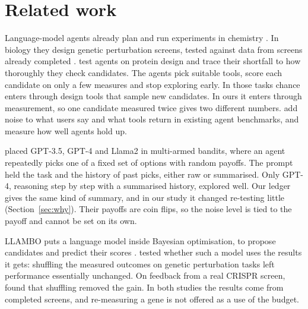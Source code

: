 \section{Related work}
\label{sec:related}

Language-model agents already plan and run experiments in chemistry \citep{boiko2023coscientist}. In biology they
design genetic perturbation screens, tested against data from screens already completed \citep{roohani2024biodiscovery}.
\citet{biodesignbench2026} test agents on protein design and trace their shortfall to how thoroughly they check
candidates. The agents pick suitable tools, score each candidate on only a few measures and stop exploring early. In
those tasks chance enters through design tools that sample new candidates. In ours it enters through measurement, so
one candidate measured twice gives two different numbers. \citet{wang2026agentnoise} add noise to what users say and
what tools return in existing agent benchmarks, and measure how well agents hold up.

\citet{krishnamurthy2024explore} placed GPT-3.5, GPT-4 and Llama2 in multi-armed bandits, where an agent repeatedly
picks one of a fixed set of options with random payoffs. The prompt held the task and the history of past picks, either raw
or summarised. Only GPT-4, reasoning step by step with a summarised history, explored well. Our ledger gives the same
kind of summary, and in our study it changed re-testing little (Section~\ref{sec:why}). Their payoffs are coin flips,
so the noise level is tied to the payoff and cannot be set on its own.

LLAMBO puts a language model inside Bayesian optimisation, to propose candidates and predict their scores
\citep{liu2024llambo}. \citet{gupta2025bayesopt} tested whether such a model uses the results it gets: shuffling the
measured outcomes on genetic perturbation tasks left performance essentially unchanged. On feedback from a real CRISPR
screen, \citet{wainrib2026labloop} found that shuffling removed the gain. In both studies the results come from
completed screens, and re-measuring a gene is not offered as a use of the budget.

